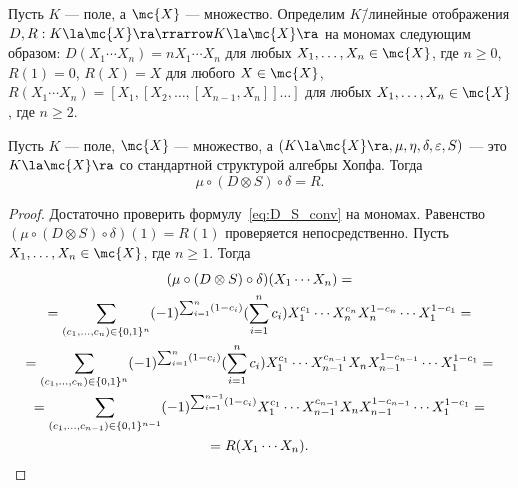 \documentclass[
	extrafontsizes,
	11pt,
	hyphens,
]{memoir}
\begin{document}

\begin{definition}
Пусть \(K\) --- поле, а \(\mc{X}\) --- множество.
Определим \(K\)\=/линейные отображения \(D, R : K \la \mc{X} \ra \rrarrow K \la \mc{X} \ra\) на мономах следующим образом:
\(D(X_1 \cdots{} X_n) = n X_1 \cdots{} X_n\) для любых \(X_1, \dots{}, X_n \in \mc{X}\), где \(n \geq 0\),
\(R(1) = 0\), \(R(X) = X\) для любого \(X \in \mc{X}\),
\(R(X_1 \cdots{} X_n) = [X_1, [X_2, \dots{}, [X_{n-1}, X_n]] \dots{} ]\) для любых \(X_1, \dots{}, X_n \in \mc{X}\), где \(n \geq 2\).
\end{definition}

\begin{lemma}
Пусть \(K\) --- поле, \(\mc{X}\) --- множество, а \((K \la \mc{X} \ra, \mu, \eta, \delta, \varepsilon, S)\) --- это \(K \la \mc{X} \ra\) со стандартной структурой алгебры Хопфа.
Тогда
\begin{equation}
\mu \circ (D \otimes S) \circ \delta = R.%
\label{eq:D_S_conv}
\end{equation}
\end{lemma}

\begin{proof}
Достаточно проверить формулу~\eqref{eq:D_S_conv} на мономах. Равенство
\((\mu \circ (D \otimes S) \circ \delta)(1) = R(1)\)
проверяется непосредственно.
Пусть \(X_1, \dots{}, X_n \in \mc{X}\), где \(n \geq 1\).
Тогда
\begin{gather*}
(\mu \circ (D \otimes S) \circ \delta)
(X_1 \cdots{} X_n)
=
\\
=
\sum_{(c_1, \dots{}, c_n) \in \{0,1\}^n}
(-1)^{\sum_{i=1}^n (1 - c_i)}
(\sum_{i=1}^n c_i)
X_1^{c_1} \cdots{} X_n^{c_n} X_n^{1 - c_n} \cdots{} X_1^{1 - c_1}
=
\\
=
\sum_{(c_1, \dots{}, c_n) \in \{0,1\}^n}
(-1)^{\sum_{i=1}^n (1 - c_i)}
(\sum_{i=1}^n c_i)
X_1^{c_1} \cdots{} X_{n-1}^{c_{n-1}} X_n X_{n-1}^{1 - c_{n-1}} \cdots{} X_1^{1 - c_1}
=
\\
=
\sum_{(c_1, \dots{}, c_{n-1}) \in \{0,1\}^{n-1}}
(-1)^{\sum_{i=1}^{n-1} (1 - c_i)}
X_1^{c_1} \cdots{} X_{n-1}^{c_{n-1}} X_n X_{n-1}^{1 - c_{n-1}} \cdots{} X_1^{1 - c_1}
=
\\
=
R(X_1 \cdots{} X_n).
\qedhere
\end{gather*}
\end{proof}
\end{document}
